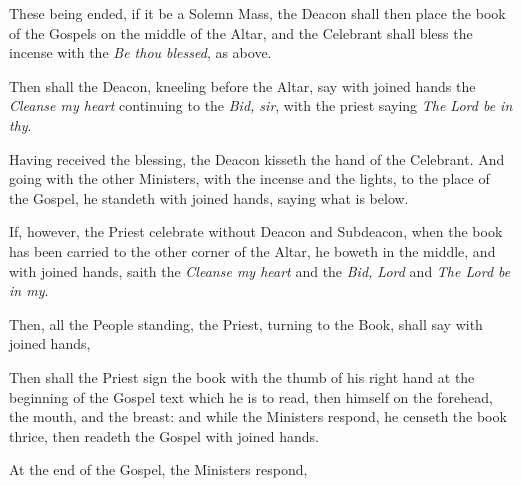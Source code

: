\begin{multicols}{2}
\begin{rubric}
    These being ended, if it be a Solemn Mass, the Deacon shall then place the book of the Gospels on the middle of the Altar, and the Celebrant shall bless the incense with the \emph{Be thou blessed}, as above.
\end{rubric}
\begin{rubric}
	Then shall the Deacon, kneeling before the Altar, say with joined hands the \emph{Cleanse my heart} continuing to the \emph{Bid, sir}, with the priest saying \emph{The Lord be in thy}.
\end{rubric}

\begin{rubric}
    Having received the blessing, the Deacon kisseth the hand of the Celebrant. And going with the other Ministers, with the incense and the lights, to the place of the Gospel, he standeth with joined hands, saying what is below.
\end{rubric}
\begin{rubric}
    If, however, the Priest celebrate without Deacon and Subdeacon, when the book has been carried to the other corner of the Altar, he boweth in the middle, and with joined hands, saith the \emph{Cleanse my heart} and the \emph{Bid, Lord} and \emph{The Lord be in my}.
\end{rubric}
\end{multicols}
\begin{rubric}
	Then, all the People standing, the Priest, turning to the Book, shall say with joined hands,
\end{rubric}
\begin{rubric}
    Then shall the Priest sign the book with the thumb of his right hand at the beginning of the Gospel text which he is to read, then himself on the forehead, the mouth, and the breast: and while the Ministers respond, he censeth the book thrice, then readeth the Gospel with joined hands.
\end{rubric}
\begin{rubric}
    At the end of the Gospel, the Ministers respond,
\end{rubric}
